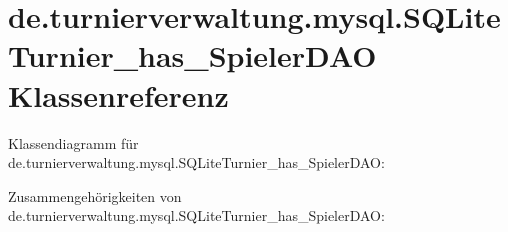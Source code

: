 \hypertarget{classde_1_1turnierverwaltung_1_1mysql_1_1_s_q_lite_turnier__has___spieler_d_a_o}{}\section{de.\+turnierverwaltung.\+mysql.\+S\+Q\+Lite\+Turnier\+\_\+has\+\_\+\+Spieler\+D\+AO Klassenreferenz}
\label{classde_1_1turnierverwaltung_1_1mysql_1_1_s_q_lite_turnier__has___spieler_d_a_o}


Klassendiagramm für de.\+turnierverwaltung.\+mysql.\+S\+Q\+Lite\+Turnier\+\_\+has\+\_\+\+Spieler\+D\+AO\+:


Zusammengehörigkeiten von de.\+turnierverwaltung.\+mysql.\+S\+Q\+Lite\+Turnier\+\_\+has\+\_\+\+Spieler\+D\+AO\+:
